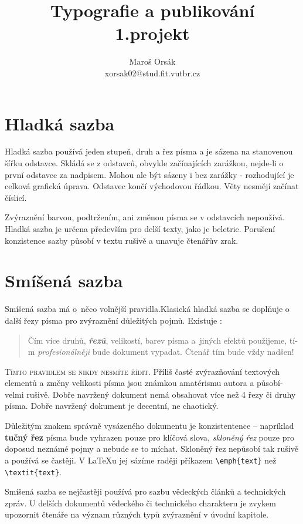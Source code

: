 \documentclass[a4paper,twocolumn,10pt]{article}
\title{Typografie a publikování \\ 1.projekt  }
\author{Maroš Orsák \\xorsak02@stud.fit.vutbr.cz}
\date{}
\begin{document}
\maketitle

\section{Hladká sazba}     

Hladká sazba používá jeden stupeň, druh a řez písma a je sázena na stanovenou šířku odstavce. Skládá se z odstavců, obvykle začínajících zarážkou, nejde-li o první odstavec za nadpisem. Mohou ale být sázeny i bez zarážky - rozhodující je celková grafická úprava. Odstavec končí východovou řádkou. Věty nesmějí začínat číslicí.

Zvýraznění barvou, podtržením, ani změnou písma se v odstavcích nepoužívá. Hladká sazba je určena především pro delší texty, jako je beletrie. Porušení konzistence sazby působí v textu rušivě a unavuje čtenářův zrak.


\section{Smíšená sazba}

Smíšená sazba má o~něco volnější­ pravidla.Klasická  hladká sazba se doplňuje o další řezy pí­sma pro zvýraznění­ důležitých pojmů. Existuje :


\begin{quotation}
Čím ví­ce druhů, \textbf{\textit{řezů}},  velikostí, barev pí­sma a~jiných efektů použijeme, tí­m \textsl{profesionálněji} bude dokument vypadat. Čtenář tím {\tiny bude} vždy \mbox{{\Huge nadšen!}} 
\end{quotation}

\textsc{Tí­mto pravidlem se nikdy nesmí­te ří­dit.} Příliš časté zvýrazňování textových elementů  a změny velikosti pí­sma jsou známkou amatérismu autora a působí­ velmi rušivě. Dobře navržený dokument nemá obsahovat ví­ce než 4 řezy či druhy pí­sma. Dobře navržený dokument je decentní­, ne chaotický.

Důležitým znakem správně vysázeného dokumentu je  konzistentence -- napríklad \textbf{tučný řez} pí­sma bude vyhrazen pouze pro klíčová slova, \textsl{skloněný řez} pouze pro doposud neznámé pojmy a nebude se to míchat. Skloněný řez nepůsobí­ tak rušivě a použí­vá se častěji. V \LaTeX u jej sází­me raději pří­kazem \verb|\emph{text}| než \verb|\textit{text}|.

Smíšená sazba se nejčastěji používá pro sazbu vědeckých článků a technických zpráv. U delší­ch dokumentů vědeckého či technického charakteru je zvykem upozornit čtenáře na význam různých typů zvýraznění­ v úvodní­ kapitole.
\end{document}
